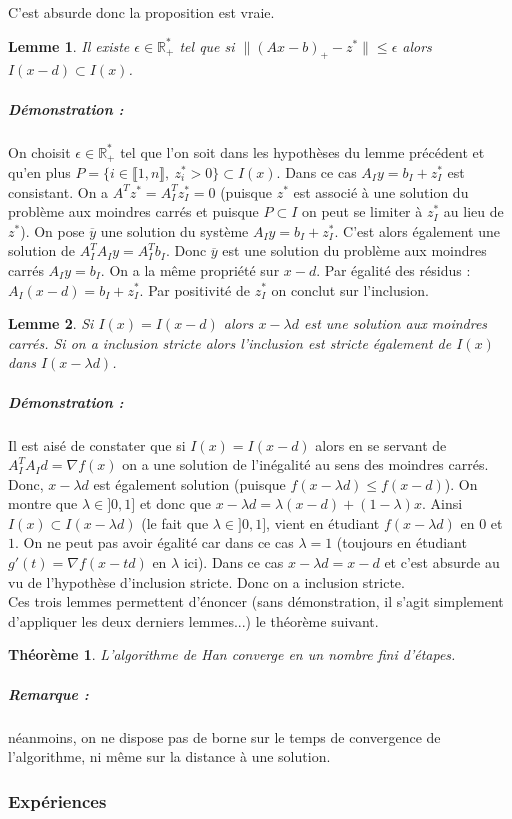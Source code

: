 \documentclass[10pt,a4paper]{article}
\newtheorem{thm}{Théorème}
\newtheorem{lemma}{Lemme}
\begin{document}
C'est absurde donc la proposition est vraie.
\begin{lemma}
Il existe $\epsilon \in \mathbb{R}_+^*$ tel que si $\| (Ax-b)_+ -z^*\| \le \epsilon$ alors $I(x-d) \subset I(x)$.
\end{lemma}
\subparagraph{Démonstration :} On choisit $\epsilon \in \mathbb{R}_+^*$ tel que l'on soit dans les hypothèses du lemme précédent et qu'en plus $P=\lbrace i \in \llbracket 1,n \rrbracket, \ z_i^* >0 \rbrace \subset I(x)$.
Dans ce cas $A_I y =b_I +z_I^*$ est consistant.
On a $A^T z^* =A_I^T z_I^* =0$ (puisque $z^*$ est associé à une solution du problème aux moindres carrés et puisque $P \subset I$ on peut se limiter à $z_I^*$ au lieu de $z^*$).
On pose $\overline{y}$ une solution du système $A_Iy=b_I+z_I^*$.  C'est alors également une solution de $A_I^TA_Iy=A_I^Tb_I$.
Donc $\overline{y}$ est une solution du problème aux moindres carrés $A_Iy=b_I$.
On a la même propriété sur $x-d$.
Par égalité des résidus : $A_I(x-d)=b_I+z_I^*$.
Par positivité de $z_I^*$ on conclut sur l'inclusion.
\begin{lemma}
Si $I(x)=I(x-d)$ alors $x-\lambda d$ est une solution aux moindres carrés.
Si on a inclusion stricte alors l'inclusion est stricte également de $I(x)$ dans $I(x-\lambda d)$.
\end{lemma}
\subparagraph{Démonstration :} Il est aisé de constater que si $I(x)=I(x-d)$ alors en se servant de $A_I^TA_I d= \nabla f(x)$ on a une solution de l'inégalité au sens des moindres carrés.
Donc, $x-\lambda d$ est également solution (puisque $f(x-\lambda d) \le f(x-d)$).
On montre que $\lambda \in ]0,1]$ et donc que $x-\lambda d= \lambda (x-d) +(1-\lambda) x$.
Ainsi $I(x) \subset I(x -\lambda d)$ (le fait que $\lambda \in ]0,1]$, vient en étudiant $f(x-\lambda d)$ en $0$ et $1$.
On ne peut pas avoir égalité car dans ce cas $\lambda=1$ (toujours en étudiant $g'(t)=\nabla f(x-td)$ en $\lambda$ ici).
Dans ce cas $x-\lambda d =x- d$ et c'est absurde au vu de l'hypothèse d'inclusion stricte.
Donc on a inclusion stricte.\\
Ces trois lemmes permettent d'énoncer (sans démonstration, il s'agit simplement d'appliquer les deux derniers lemmes...) le théorème suivant.
\begin{thm}
L'algorithme de Han converge en un nombre fini d'étapes.
\end{thm}
\subparagraph{Remarque :} néanmoins, on ne dispose pas de borne sur le temps de convergence de l'algorithme, ni même sur la distance à une solution.
\subsubsection{Expériences}
\end{document}
